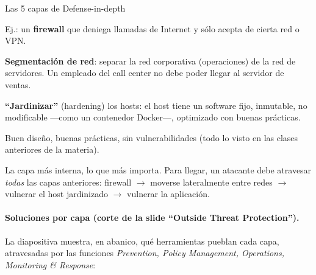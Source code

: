 \documentclass[11pt,a4paper]{article}
\begin{document}
\begin{defbox}{Las 5 capas de Defense-in-depth}
\begin{description}[leftmargin=0pt,labelsep=0.4em,style=nextline,itemsep=2pt]
  \item[Perímetro] Ej.: un \textbf{firewall} que deniega llamadas de Internet y sólo acepta de
        cierta red o VPN.
  \item[Red (Network)] \textbf{Segmentación de red}: separar la red corporativa (operaciones)
        de la red de servidores. Un empleado del call center no debe poder llegar al servidor
        de ventas.
  \item[Host] \textbf{``Jardinizar''} (hardening) los hosts: el host tiene un software fijo,
        inmutable, no modificable —como un contenedor Docker—, optimizado con buenas prácticas.
  \item[Aplicación] Buen diseño, buenas prácticas, sin vulnerabilidades (todo lo visto en las
        clases anteriores de la materia).
  \item[Datos] La capa más interna, lo que más importa. Para llegar, un atacante debe atravesar
        \emph{todas} las capas anteriores: firewall $\to$ moverse lateralmente entre redes $\to$
        vulnerar el host jardinizado $\to$ vulnerar la aplicación.
\end{description}
\end{defbox}

\paragraph{Soluciones por capa (corte de la slide ``Outside Threat Protection'').}
La diapositiva muestra, en abanico, qué herramientas pueblan cada capa, atravesadas por las
funciones \emph{Prevention, Policy Management, Operations, Monitoring \& Response}:
\end{document}
